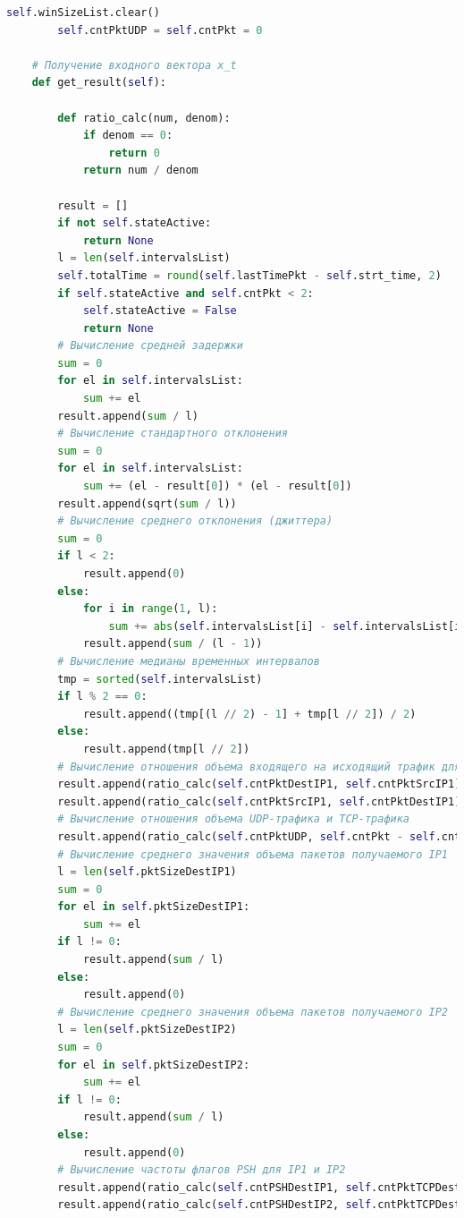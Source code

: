 \documentclass[bachelor, och, coursework]{SCWorks}
\begin{document}
\begin{lstlisting}[language=Python]
        self.winSizeList.clear()
        self.cntPktUDP = self.cntPkt = 0

    # Получение входного вектора x_t
    def get_result(self):
        
        def ratio_calc(num, denom):
            if denom == 0:
                return 0
            return num / denom

        result = []
        if not self.stateActive:
            return None
        l = len(self.intervalsList)
        self.totalTime = round(self.lastTimePkt - self.strt_time, 2)
        if self.stateActive and self.cntPkt < 2:
            self.stateActive = False
            return None
        # Вычисление средней задержки
        sum = 0
        for el in self.intervalsList:
            sum += el
        result.append(sum / l)
        # Вычисление стандартного отклонения
        sum = 0
        for el in self.intervalsList:
            sum += (el - result[0]) * (el - result[0])
        result.append(sqrt(sum / l))
        # Вычисление среднего отклонения (джиттера)
        sum = 0
        if l < 2:
            result.append(0)
        else:
            for i in range(1, l):
                sum += abs(self.intervalsList[i] - self.intervalsList[i - 1])
            result.append(sum / (l - 1))
        # Вычисление медианы временных интервалов
        tmp = sorted(self.intervalsList)
        if l % 2 == 0:
            result.append((tmp[(l // 2) - 1] + tmp[l // 2]) / 2)
        else:
            result.append(tmp[l // 2])
        # Вычисление отношения объема входящего на исходящий трафик для IP1 и IP2
        result.append(ratio_calc(self.cntPktDestIP1, self.cntPktSrcIP1))
        result.append(ratio_calc(self.cntPktSrcIP1, self.cntPktDestIP1))
        # Вычисление отношения объема UDP-трафика и TCP-трафика
        result.append(ratio_calc(self.cntPktUDP, self.cntPkt - self.cntPktUDP))
        # Вычисление среднего значения объема пакетов получаемого IP1
        l = len(self.pktSizeDestIP1)
        sum = 0
        for el in self.pktSizeDestIP1:
            sum += el
        if l != 0:
            result.append(sum / l)
        else:
            result.append(0)
        # Вычисление среднего значения объема пакетов получаемого IP2
        l = len(self.pktSizeDestIP2)
        sum = 0
        for el in self.pktSizeDestIP2:
            sum += el
        if l != 0:
            result.append(sum / l)
        else:
            result.append(0)
        # Вычисление частоты флагов PSH для IP1 и IP2
        result.append(ratio_calc(self.cntPSHDestIP1, self.cntPktTCPDestIP1))
        result.append(ratio_calc(self.cntPSHDestIP2, self.cntPktTCPDestIP2))

\end{lstlisting}
\end{document}
